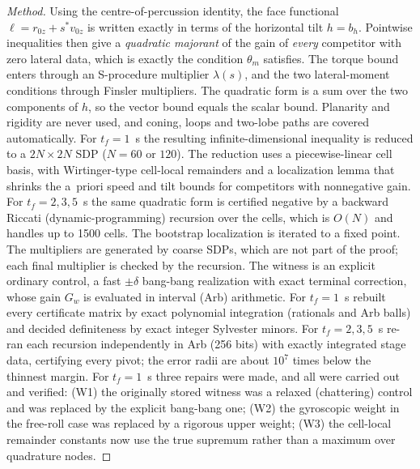 \begin{proof}[Method]
Using the centre-of-percussion identity, the face functional $\ell=r_{0z}+s^*v_{0z}$ is written exactly in terms of the horizontal
tilt $h=b_h$. Pointwise inequalities then give a \emph{quadratic majorant} of the gain of \emph{every} competitor with zero lateral data,
which is exactly the condition $\theta_m$ satisfies. The torque bound enters through an S-procedure multiplier $\lambda(s)$, and the
two lateral-moment conditions through Finsler multipliers. The quadratic form is a sum over the two components of $h$, so the
vector bound equals the scalar bound. Planarity and rigidity are never used, and coning, loops and two-lobe paths are covered
automatically.
For $t_f=1$~s the resulting infinite-dimensional inequality is reduced to a $2N\times2N$ SDP ($N=60$ or $120$). The reduction uses a
piecewise-linear cell basis, with Wirtinger-type cell-local remainders and a localization lemma that shrinks the a~priori speed and
tilt bounds for competitors with nonnegative gain. For $t_f=2,3,5$~s the same quadratic form is certified negative by a backward
Riccati (dynamic-programming) recursion over the cells, which is $O(N)$ and handles up to 1500 cells. The bootstrap localization is
iterated to a fixed point. The multipliers are generated by coarse SDPs, which are not part of the proof; each final multiplier
is checked by the recursion. The witness is an explicit ordinary control, a fast $\pm\delta$ bang-bang realization with
exact terminal correction, whose gain $G_w$ is evaluated in interval (Arb) arithmetic.
For $t_f=1$~s  rebuilt every certificate matrix by exact polynomial integration (rationals and Arb balls)
and decided definiteness by exact integer Sylvester minors. For $t_f=2,3,5$~s  re-ran each recursion independently in Arb
(256 bits) with exactly integrated stage data, certifying every pivot; the error radii are about $10^7$ times below the thinnest
margin.  For $t_f=1$~s three repairs were made, and all were carried out and
verified:
(W1) the originally stored witness was a relaxed (chattering) control and was replaced by the explicit bang-bang one;
(W2) the gyroscopic weight in the free-roll case was replaced by a rigorous upper weight;
(W3) the cell-local remainder constants now use the true supremum rather than a maximum over quadrature nodes.
\end{proof}

